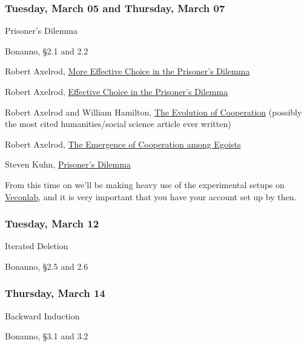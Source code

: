 \documentclass[
  12pt,
  letterpaper,
  DIV=11,
  numbers=noendperiod]{scrartcl}
\providecommand{\tightlist}{%
  \setlength{\itemsep}{0pt}\setlength{\parskip}{0pt}}\usepackage{longtable,booktabs,array}
\begin{document}
\subsubsection{Tuesday, March 05 and Thursday, March
07}\label{tuesday-march-05-and-thursday-march-07}

\begin{description}
\tightlist
\item[Topic]
Prisoner's Dilemma
\item[Reading]
Bonanno, §2.1 and 2.2

Robert Axelrod, \href{https://www.jstor.org/stable/173638}{More
Effective Choice in the Prisoner's Dilemma}
\item[Recommended]
Robert Axelrod, \href{https://www.jstor.org/stable/173932}{Effective
Choice in the Prisoner's Dilemma}

Robert Axelrod and William Hamilton,
\href{https://www.jstor.org/stable/1685895}{The Evolution of
Cooperation} (possibly the most cited humanities/social science article
ever written)

Robert Axelrod, \href{https://www.jstor.org/stable/1961366}{The
Emergence of Cooperation among Egoists}

Steven Kuhn,
\href{https://plato.stanford.edu/entries/prisoner-dilemma/}{Prisoner's
Dilemma}
\item[Interaction]
From this time on we'll be making heavy use of the experimental setups
on \href{https://veconlab.econ.virginia.edu/}{Veconlab}, and it is very
important that you have your account set up by then.
\end{description}

\subsubsection{Tuesday, March 12}\label{tuesday-march-12}

\begin{description}
\tightlist
\item[Topic]
Iterated Deletion
\item[Reading]
Bonanno, §2.5 and 2.6
\end{description}

\subsubsection{Thursday, March 14}\label{thursday-march-14}

\begin{description}
\tightlist
\item[Topic]
Backward Induction
\item[Reading]
Bonanno, §3.1 and 3.2
\end{description}
\end{document}
